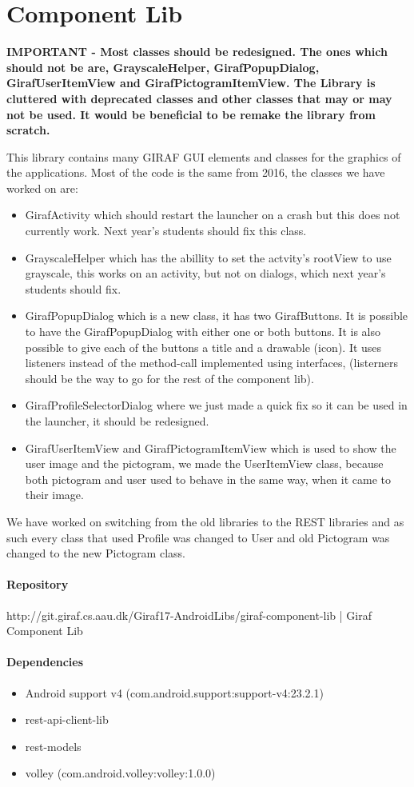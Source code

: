 \chapter{Component Lib}\label{WikiCompLib}
\textbf{IMPORTANT - Most classes should be redesigned. The ones which should not
be are, GrayscaleHelper, GirafPopupDialog, GirafUserItemView and
GirafPictogramItemView. The Library is cluttered with deprecated classes and
other classes that may or may not be used. It would
be beneficial to be remake the library from scratch.}\nl

This library contains many GIRAF GUI elements and classes for the graphics of
the applications. Most of the code is the same from 2016, the classes we have
worked on are:

\begin{itemize}
  \item GirafActivity which should restart the launcher on a crash but this
  does not currently work. Next year's students should fix this class.
  \item GrayscaleHelper which has the abillity to set the actvity's rootView to
  use grayscale, this works on an activity, but not on dialogs,  which next
  year's students should fix.
  \item GirafPopupDialog which is a new class, it has two GirafButtons. It is
  possible to have the GirafPopupDialog with either one or both buttons. It is
  also possible to give each of the buttons a title and a drawable (icon). It
  uses listeners instead of the method-call implemented using interfaces,
  (listerners should be the way to go for the rest of the component lib).
  \item GirafProfileSelectorDialog where we just made a quick fix so it can
  be used in the launcher, it should be redesigned.
  \item GirafUserItemView and GirafPictogramItemView which is used to show the
  user image and the pictogram,  we made the UserItemView class, because both
  pictogram and user used to behave in the same way, when it came to their
  image.
  
\end{itemize}

We have worked on switching from the old libraries to the REST libraries and as
such every class that used Profile was changed to User and old Pictogram was
changed to the new Pictogram class.

\subsubsection{Repository}
http://git.giraf.cs.aau.dk/Giraf17-AndroidLibs/giraf-component-lib | Giraf Component Lib

\subsubsection{Dependencies}
\begin{itemize}
  \item Android support v4 (com.android.support:support-v4:23.2.1)
  \item rest-api-client-lib
  \item rest-models
  \item volley (com.android.volley:volley:1.0.0)
\end{itemize}

